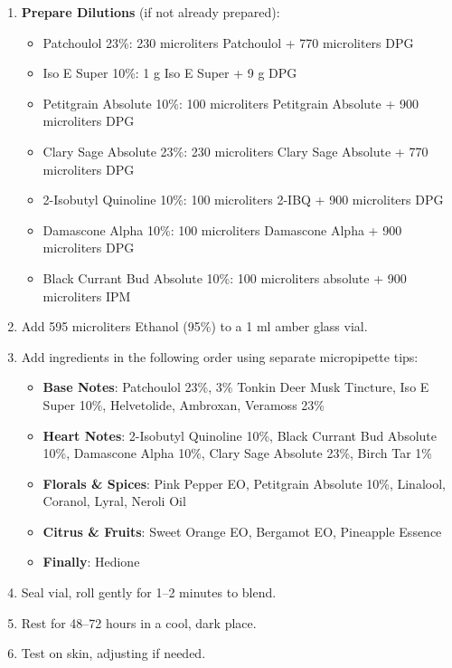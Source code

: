 \documentclass{article}
\begin{document}
\begin{enumerate}
    \item \textbf{Prepare Dilutions} (if not already prepared):
    \begin{itemize}
        \item Patchoulol 23\%: 230 microliters Patchoulol + 770 microliters DPG
        \item Iso E Super 10\%: 1 g Iso E Super + 9 g DPG
        \item Petitgrain Absolute 10\%: 100 microliters Petitgrain Absolute + 900 microliters DPG
        \item Clary Sage Absolute 23\%: 230 microliters Clary Sage Absolute + 770 microliters DPG
        \item 2-Isobutyl Quinoline 10\%: 100 microliters 2-IBQ + 900 microliters DPG
        \item Damascone Alpha 10\%: 100 microliters Damascone Alpha + 900 microliters DPG
        \item Black Currant Bud Absolute 10\%: 100 microliters absolute + 900 microliters IPM
    \end{itemize}
    
    \item Add 595 microliters Ethanol (95\%) to a 1 ml amber glass vial.
    
    \item Add ingredients in the following order using separate micropipette tips:
    \begin{itemize}
        \item \textbf{Base Notes}: Patchoulol 23\%, 3\% Tonkin Deer Musk Tincture, Iso E Super 10\%, Helvetolide, Ambroxan, Veramoss 23\%
        \item \textbf{Heart Notes}: 2-Isobutyl Quinoline 10\%, Black Currant Bud Absolute 10\%, Damascone Alpha 10\%, Clary Sage Absolute 23\%, Birch Tar 1\%
        \item \textbf{Florals \& Spices}: Pink Pepper EO, Petitgrain Absolute 10\%, Linalool, Coranol, Lyral, Neroli Oil
        \item \textbf{Citrus \& Fruits}: Sweet Orange EO, Bergamot EO, Pineapple Essence
        \item \textbf{Finally}: Hedione
    \end{itemize}
    
    \item Seal vial, roll gently for 1--2 minutes to blend.
    
    \item Rest for 48--72 hours in a cool, dark place.
    
    \item Test on skin, adjusting if needed.
\end{enumerate}
\end{document}
